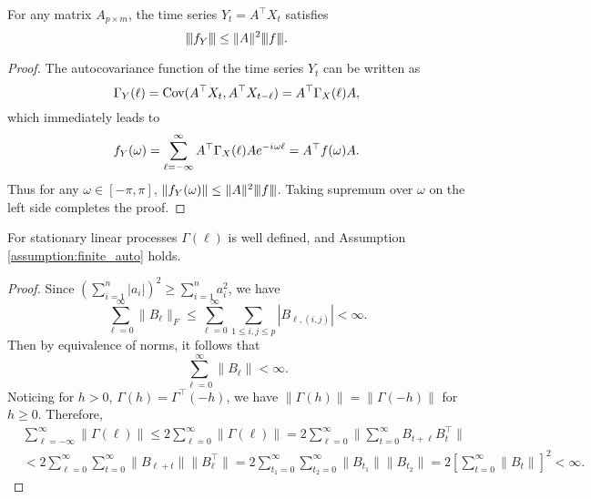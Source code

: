 \begin{lem}
\label{lemma:max-L2-norm-Y}
For any matrix $A_{p\times m}$, the time series $Y_t = A^\top {X}_t$ satisfies
\begin{equation}
{\left\vert\kern-0.25ex\left\vert\kern-0.25ex\left\vert f_Y \right\vert\kern-0.25ex\right\vert\kern-0.25ex\right\vert} \le \|A\|^2 {\left\vert\kern-0.25ex\left\vert\kern-0.25ex\left\vert f \right\vert\kern-0.25ex\right\vert\kern-0.25ex\right\vert}. \nonumber
\end{equation}
\begin{proof}
The autocovariance function of the time series  $Y_t$ can be written as 
\begin{equation}
    \Gamma_Y(\ell) = \mbox{Cov}(A^\top {X}_t, A^\top {X}_{t-\ell}) = A^\top \Gamma_{X}(\ell) A,
\end{equation}
which immediately leads to  
\begin{equation}
f_Y(\omega) = \sum_{\ell=-\infty}^\infty A^\top \Gamma_{X}(\ell)A e^{-{i\mkern1mu}\omega\ell} = A^\top  f(\omega)A.
\end{equation}
Thus for any $\omega \in [-\pi, \pi]$, $\|f_Y(\omega)\| \le \|A\|^2{\left\vert\kern-0.25ex\left\vert\kern-0.25ex\left\vert f \right\vert\kern-0.25ex\right\vert\kern-0.25ex\right\vert}$. Taking supremum over $\omega$ on the left side completes the proof. 
\end{proof}
\end{lem}

\begin{lem}
\label{lemma:linear_assumption}
For stationary linear processes $\Gamma(\ell)$ is well defined, and Assumption \ref{assumption:finite_auto} holds.
\begin{proof}
Since $(\sum_{i=1}^n |a_i|)^2 \ge \sum_{i=1}^n a_i^2$, we have 
\begin{equation}
\sum_{\ell=0}^\infty \|B_\ell\|_F \le \sum_{\ell=0}^\infty \sum_{1\le i,j\le p} |B_{\ell, (i,j)}|<\infty. \nonumber
\end{equation}
Then by equivalence of norms, it follows that
\begin{equation}
\sum_{\ell=0}^\infty \|B_\ell\| < \infty.
\end{equation}
Noticing for $h>0$, $\Gamma(h) = \Gamma^\top(-h)$, we have $\|\Gamma(h)\| = \|\Gamma(-h)\|$ for $h\ge 0$. Therefore, 
\begin{equation}
\begin{aligned}
\label{eq:finite_sum_auto}
&\sum_{\ell = -\infty}^\infty \|\Gamma(\ell)\| \le 2\sum_{\ell=0}^\infty \|\Gamma(\ell)\|
= 2\sum_{\ell = 0}^\infty \|\sum_{t=0}^\infty B_{t+\ell} B_{t}^\top \| \\
&<2\sum_{\ell = 0}^\infty \sum_{t=0}^\infty \|B_{\ell+t}\|\|B_\ell^\top\| = 
2\sum_{t_1=0}^\infty \sum_{t_2=0}^\infty \|B_{t_1}\|\|B_{t_2}\|=2\left[\sum_{t=0}^\infty \|B_t\|\right]^2<\infty.
\end{aligned}
\end{equation}
\end{proof}
\end{lem}


